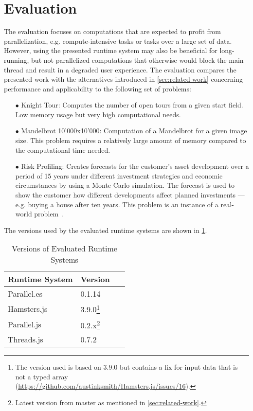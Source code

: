 \section{Evaluation}\label{sec:evaluation}
The evaluation focuses on computations that are expected to profit from parallelization, e.g. compute-intensive tasks or tasks over a large set of data. However, using the presented runtime system may also be beneficial for long-running, but not parallelized computations that otherwise would block the main thread and result in a degraded user experience. The evaluation compares the presented work with the alternatives introduced in \cref{sec:related-work} concerning performance and applicability to the following set of problems:

\begin{itemize}
	\item[$\bullet$] Knight Tour: Computes the number of open tours from a given start field. Low memory usage but very high computational needs.
	\item[$\bullet$] Mandelbrot 10'000x10'000: Computation of a Mandelbrot for a given image size. This problem requires a relatively large amount of memory compared to the computational time needed.
	\item[$\bullet$] Risk Profiling: Creates forecasts for the customer's asset development over a period of 15 years under different investment strategies and economic circumstances by using a Monte Carlo simulation. The forecast is used to show the customer how different developments affect planned investments --- e.g. buying a house after ten years. This problem is an instance of a real-world problem~\cite{Kwsoft2016}.
\end{itemize}

The versions used by the evaluated runtime systems are shown in \cref{tab:runtime-system-version}.

\begin{table}
	\centering
	\begin{tabular}{p{0.6\linewidth} l}
		\toprule
		Runtime System & Version \\ \midrule
		Parallel.es & 0.1.14 \\
		Hamsters.js & 3.9.0\footnote{The version used is based on 3.9.0 but contains a fix for input data that is not a typed array (\url{https://github.com/austinksmith/Hamsters.js/issues/16}).} \\
		Parallel.js & 0.2.x\footnote{Latest version from master as mentioned in \cref{sec:related-work}.} \\
		Threads.js & 0.7.2 \\ \bottomrule
	\end{tabular}
	\caption{Versions of Evaluated Runtime Systems}
	\label{tab:runtime-system-version}
\end{table}


